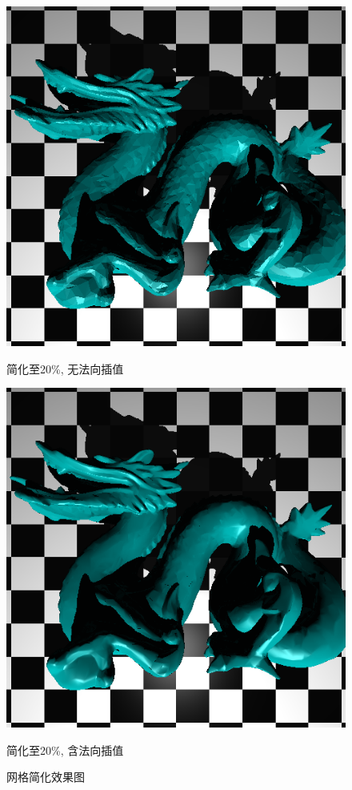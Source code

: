 \begin{enumerate}
\begin{figure}[H]
      \begin{minipage}[b]{0.46\linewidth}
        \centering
        \includegraphics[width=\textwidth]{img/simplified_nosmooth.png}
        \caption*{简化至20\%, 无法向插值}
      \end{minipage}
      \begin{minipage}[b]{0.46\linewidth}
        \centering
        \includegraphics[width=\textwidth]{img/simplified_smooth.png}
        \caption*{简化至20\%, 含法向插值}
      \end{minipage}
      \caption{网格简化效果图\label{fig:simplify}}


\end{figure}
\end{enumerate}
